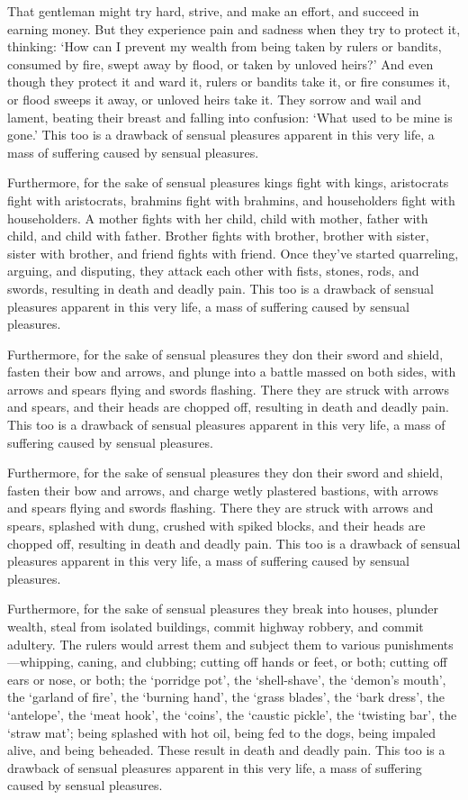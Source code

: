 \documentclass[12pt,openany]{book}%
\begin{document}
That gentleman might try hard, strive, and make an effort, and succeed in earning money. But they experience pain and sadness when they try to protect it, thinking: ‘How can I prevent my wealth from being taken by rulers or bandits, consumed by fire, swept away by flood, or taken by unloved heirs?’ And even though they protect it and ward it, rulers or bandits take it, or fire consumes it, or flood sweeps it away, or unloved heirs take it. They sorrow and wail and lament, beating their breast and falling into confusion: ‘What used to be mine is gone.’ This too is a drawback of sensual pleasures apparent in this very life, a mass of suffering caused by sensual pleasures. 

Furthermore, for the sake of sensual pleasures kings fight with kings, aristocrats fight with aristocrats, brahmins fight with brahmins, and householders fight with householders. A mother fights with her child, child with mother, father with child, and child with father. Brother fights with brother, brother with sister, sister with brother, and friend fights with friend. Once they’ve started quarreling, arguing, and disputing, they attack each other with fists, stones, rods, and swords, resulting in death and deadly pain. This too is a drawback of sensual pleasures apparent in this very life, a mass of suffering caused by sensual pleasures. 

Furthermore, for the sake of sensual pleasures they don their sword and shield, fasten their bow and arrows, and plunge into a battle massed on both sides, with arrows and spears flying and swords flashing. There they are struck with arrows and spears, and their heads are chopped off, resulting in death and deadly pain. This too is a drawback of sensual pleasures apparent in this very life, a mass of suffering caused by sensual pleasures. 

Furthermore, for the sake of sensual pleasures they don their sword and shield, fasten their bow and arrows, and charge wetly plastered bastions, with arrows and spears flying and swords flashing. There they are struck with arrows and spears, splashed with dung, crushed with spiked blocks, and their heads are chopped off, resulting in death and deadly pain. This too is a drawback of sensual pleasures apparent in this very life, a mass of suffering caused by sensual pleasures. 

Furthermore, for the sake of sensual pleasures they break into houses, plunder wealth, steal from isolated buildings, commit highway robbery, and commit adultery. The rulers would arrest them and subject them to various punishments—whipping, caning, and clubbing; cutting off hands or feet, or both; cutting off ears or nose, or both; the ‘porridge pot’, the ‘shell-shave’, the ‘demon’s mouth’, the ‘garland of fire’, the ‘burning hand’, the ‘grass blades’, the ‘bark dress’, the ‘antelope’, the ‘meat hook’, the ‘coins’, the ‘caustic pickle’, the ‘twisting bar’, the ‘straw mat’; being splashed with hot oil, being fed to the dogs, being impaled alive, and being beheaded. These result in death and deadly pain. This too is a drawback of sensual pleasures apparent in this very life, a mass of suffering caused by sensual pleasures. 
\end{document}
